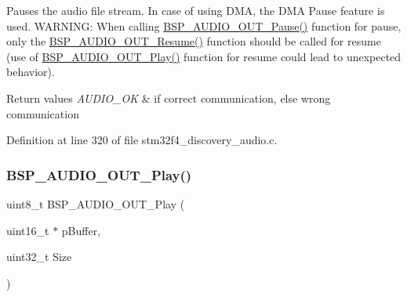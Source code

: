 Pauses the audio file stream. In case of using D\+MA, the D\+MA Pause feature is used. W\+A\+R\+N\+I\+NG\+: When calling \mbox{\hyperlink{group___s_t_m32_f4___d_i_s_c_o_v_e_r_y___a_u_d_i_o___o_u_t___private___functions_ga73a0f92b8adbfb2e8207067434c2bfef}{B\+S\+P\+\_\+\+A\+U\+D\+I\+O\+\_\+\+O\+U\+T\+\_\+\+Pause()}} function for pause, only the \mbox{\hyperlink{group___s_t_m32_f4___d_i_s_c_o_v_e_r_y___a_u_d_i_o___o_u_t___private___functions_ga064f0eddd4ab25a33fd1fe83af429c9f}{B\+S\+P\+\_\+\+A\+U\+D\+I\+O\+\_\+\+O\+U\+T\+\_\+\+Resume()}} function should be called for resume (use of \mbox{\hyperlink{group___s_t_m32_f4___d_i_s_c_o_v_e_r_y___a_u_d_i_o___o_u_t___private___functions_gaa415fdd481a01468fdfcd9d91f0f6711}{B\+S\+P\+\_\+\+A\+U\+D\+I\+O\+\_\+\+O\+U\+T\+\_\+\+Play()}} function for resume could lead to unexpected behavior). 


\begin{DoxyRetVals}{Return values}
{\em A\+U\+D\+I\+O\+\_\+\+OK} & if correct communication, else wrong communication \\
\hline
\end{DoxyRetVals}


Definition at line 320 of file stm32f4\+\_\+discovery\+\_\+audio.\+c.

\mbox{\label{group___s_t_m32_f4___d_i_s_c_o_v_e_r_y___a_u_d_i_o___o_u_t___exported___functions_gaa415fdd481a01468fdfcd9d91f0f6711}} 
\subsubsection{\texorpdfstring{B\+S\+P\+\_\+\+A\+U\+D\+I\+O\+\_\+\+O\+U\+T\+\_\+\+Play()}{BSP\_AUDIO\_OUT\_Play()}}
{\footnotesize\ttfamily uint8\+\_\+t B\+S\+P\+\_\+\+A\+U\+D\+I\+O\+\_\+\+O\+U\+T\+\_\+\+Play (\begin{DoxyParamCaption}\item[{uint16\+\_\+t $\ast$}]{p\+Buffer,  }\item[{uint32\+\_\+t}]{Size }\end{DoxyParamCaption})}



